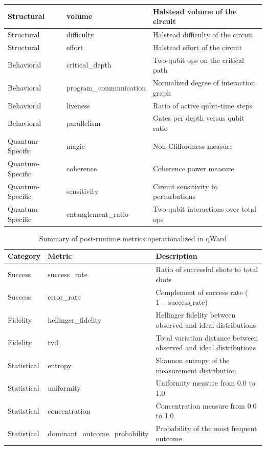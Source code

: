 \documentclass{article}
\begin{document}
\begin{table}[htbp]
\begin{tabular}{|l|l|p{5.6cm}|}
\hline
Structural & volume & Halstead volume of the circuit \\
\hline
Structural & difficulty & Halstead difficulty of the circuit \\
\hline
Structural & effort & Halstead effort of the circuit \\
\hline
Behavioral & critical\_depth & Two-qubit ops on the critical path \\
\hline
Behavioral & program\_communication & Normalized degree of interaction graph \\
\hline
Behavioral & liveness & Ratio of active qubit-time steps \\
\hline
Behavioral & parallelism & Gates per depth versus qubit ratio \\
\hline
Quantum-Specific & magic & Non-Cliffordness measure \\
\hline
Quantum-Specific & coherence & Coherence power measure \\
\hline
Quantum-Specific & sensitivity & Circuit sensitivity to perturbations \\
\hline
Quantum-Specific & entanglement\_ratio & Two-qubit interactions over total ops \\
\hline
\end{tabular}
\end{table}

\begin{table}[htbp]
\renewcommand{\arraystretch}{1.3}
\centering
\caption{Summary of post-runtime metrics operationalized in qWard}
\label{tab:postruntime-summary}
\footnotesize
\begin{tabular}{|l|l|p{6cm}|}
\hline
\textbf{Category} & \textbf{Metric} & \textbf{Description} \\
\hline
Success & success\_rate & Ratio of successful shots to total shots \\
\hline
Success & error\_rate & Complement of success rate ($1 - \text{success\_rate}$) \\
\hline
Fidelity & hellinger\_fidelity & Hellinger fidelity between observed and ideal distributions \\
\hline
Fidelity & tvd & Total variation distance between observed and ideal distributions \\
\hline
Statistical & entropy & Shannon entropy of the measurement distribution \\
\hline
Statistical & uniformity & Uniformity measure from 0.0 to 1.0 \\
\hline
Statistical & concentration & Concentration measure from 0.0 to 1.0 \\
\hline
Statistical & dominant\_outcome\_probability & Probability of the most frequent outcome \\
\hline
\end{tabular}
\end{table}
\end{document}
